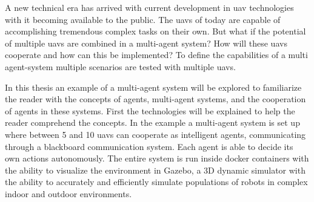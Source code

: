 A new technical era has arrived with current development in \acs{uav} technologies with it becoming available to the public. 
The \acsp{uav} of today are capable of accomplishing tremendous complex tasks on their own. But what if the potential of 
multiple \acsp{uav} are combined in a multi-agent system? 
How will these \acsp{uav} cooperate and how can this be implemented? To define the capabilities of a multi agent-system 
multiple scenarios are tested with multiple \acsp{uav}. 

In this thesis an example of a multi-agent system will be explored to familiarize the reader with the concepts of agents,
multi-agent systems, and the cooperation of agents in these systems. First the technologies will be explained to help the reader comprehend the concepts.
In the example a multi-agent system is set up where between 5 and 10 \acsp{uav} can cooperate as intelligent agents, communicating through a blackboard communication system. 
Each agent is able to decide its own actions autonomously. The entire system is run inside docker containers with the ability to visualize the environment in Gazebo, 
a 3D dynamic simulator with the ability to accurately and efficiently simulate populations of robots in complex indoor and outdoor environments.
